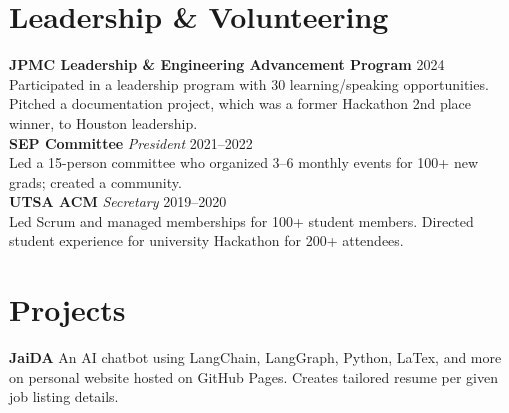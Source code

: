 \documentclass[10pt]{article}
\begin{document}
\section*{Leadership \& Volunteering}
\textbf{JPMC Leadership \& Engineering Advancement Program} \hfill 2024\\
Participated in a leadership program with 30 learning/speaking opportunities.
Pitched a documentation project, which was a former Hackathon 2nd place winner, to Houston leadership.\\
\textbf{SEP Committee} \textit{President} \hfill 2021--2022\\
Led a 15-person committee who organized 3--6 monthly events for 100+ new grads; created a community.\\
\textbf{UTSA ACM} \textit{Secretary} \hfill 2019--2020\\
Led Scrum and managed memberships for 100+ student members. Directed student experience for university Hackathon for 200+ attendees.

\section*{Projects}
\textbf{JaiDA} An AI chatbot using LangChain, LangGraph, Python, LaTex, and more on personal website hosted on GitHub Pages. Creates tailored resume per given job listing details.
\end{document}

